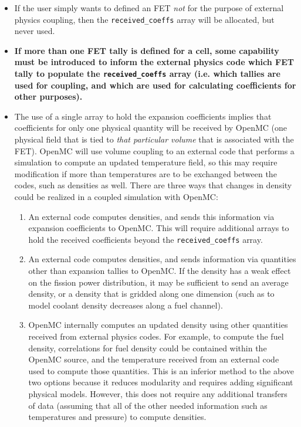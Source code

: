 \documentclass[10pt]{article}
\numberwithin{equation}{section} %
\begin{document}
\begin{itemize}
\item If the user simply wants to defined an FET {\it not} for the purpose of external physics coupling, then the {\tt received\_coeffs} array will be allocated, but never used.
\item {\bf If more than one FET tally is defined for a cell, some capability must be introduced to inform the external physics code which FET tally to populate the {\tt received\_coeffs} array (i.e. which tallies are used for coupling, and which are used for calculating coefficients for other purposes).}
\item The use of a single array to hold the expansion coefficients implies that coefficients for only one physical quantity will be received by OpenMC (one physical field that is tied to {\it that particular volume} that is associated with the FET). OpenMC will use volume coupling to an external code that performs a simulation to compute an updated temperature field, so this may require modification if more than temperatures are to be exchanged between the codes, such as densities as well. There are three ways that changes in density could be realized in a coupled simulation with OpenMC:
	\begin{enumerate}
	\item An external code computes densities, and sends this information via expansion coefficients to OpenMC. This will require additional arrays to hold the received coefficients beyond the {\tt received\_coeffs} array.
	\item An external code computes densities, and sends information via quantities other than expansion tallies to OpenMC. If the density has a weak effect on the fission power distribution, it may be sufficient to send an average density, or a density that is gridded along one dimension (such as to model coolant density decreases along a fuel channel).
	\item OpenMC internally computes an updated density using other quantities received from external physics codes. For example, to compute the fuel density, correlations for fuel density could be contained within the OpenMC source, and the temperature received from an external code used to compute those quantities. This is an inferior method to the above two options because it reduces modularity and requires adding significant physical models. However, this does not require any additional transfers of data (assuming that all of the other needed information such as temperatures and pressure) to compute densities.
	\end{enumerate}
\end{itemize}
\end{document}

